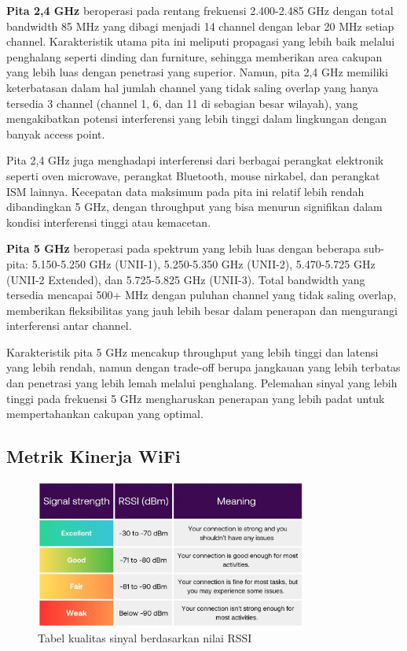 \textbf{Pita 2,4 GHz} beroperasi pada rentang frekuensi 2.400-2.485 GHz dengan total bandwidth 85 MHz yang dibagi menjadi 14 channel dengan lebar 20 MHz setiap channel. Karakteristik utama pita ini meliputi propagasi yang lebih baik melalui penghalang seperti dinding dan furniture, sehingga memberikan area cakupan yang lebih luas dengan penetrasi yang superior. Namun, pita 2,4 GHz memiliki keterbatasan dalam hal jumlah channel yang tidak saling overlap yang hanya tersedia 3 channel (channel 1, 6, dan 11 di sebagian besar wilayah), yang mengakibatkan potensi interferensi yang lebih tinggi dalam lingkungan dengan banyak access point.

Pita 2,4 GHz juga menghadapi interferensi dari berbagai perangkat elektronik seperti oven microwave, perangkat Bluetooth, mouse nirkabel, dan perangkat ISM lainnya. Kecepatan data maksimum pada pita ini relatif lebih rendah dibandingkan 5 GHz, dengan throughput yang bisa menurun signifikan dalam kondisi interferensi tinggi atau kemacetan.

\textbf{Pita 5 GHz} beroperasi pada spektrum yang lebih luas dengan beberapa sub-pita: 5.150-5.250 GHz (UNII-1), 5.250-5.350 GHz (UNII-2), 5.470-5.725 GHz (UNII-2 Extended), dan 5.725-5.825 GHz (UNII-3). Total bandwidth yang tersedia mencapai 500+ MHz dengan puluhan channel yang tidak saling overlap, memberikan fleksibilitas yang jauh lebih besar dalam penerapan dan mengurangi interferensi antar channel.

Karakteristik pita 5 GHz mencakup throughput yang lebih tinggi dan latensi yang lebih rendah, namun dengan trade-off berupa jangkauan yang lebih terbatas dan penetrasi yang lebih lemah melalui penghalang. Pelemahan sinyal yang lebih tinggi pada frekuensi 5 GHz mengharuskan penerapan yang lebih padat untuk mempertahankan cakupan yang optimal.

\subsection{Metrik Kinerja WiFi}

\begin{figure}[htbp]
    \centering
    \includegraphics[width=0.8\textwidth]{assets/pics/rssi.png}
    \caption{Tabel kualitas sinyal berdasarkan nilai RSSI}
    \label{fig:rssi}
\end{figure}

